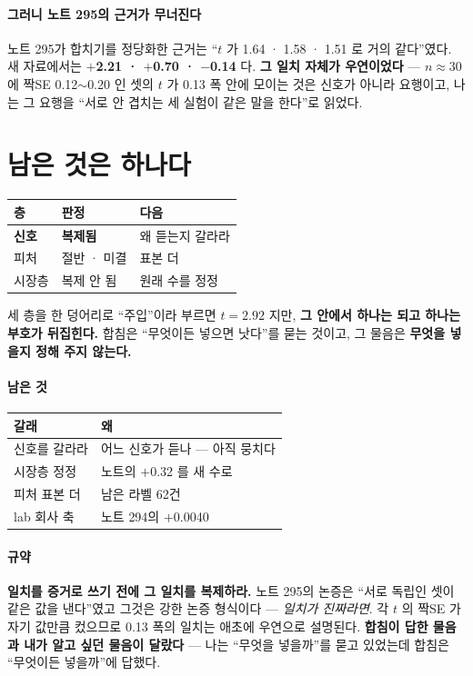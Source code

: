 \documentclass[10pt]{article}
\begin{document}
\paragraph{그러니 노트 295의 근거가 무너진다} 노트 295가 합치기를 정당화한
근거는 ``$t$ 가 1.64 · 1.58 · 1.51 로 거의 같다''였다. 새 자료에서는
\textbf{$+$2.21 · $+$0.70 · $-$0.14} 다. \textbf{그 일치 자체가 우연이었다} ---
$n{\approx}30$ 에 짝SE 0.12$\sim$0.20 인 셋의 $t$ 가 0.13 폭 안에 모이는 것은
신호가 아니라 요행이고, 나는 그 요행을 ``서로 안 겹치는 세 실험이 같은 말을
한다''로 읽었다.

\section{남은 것은 하나다}

\begin{center}\small
\begin{tabular}{lll}
\hline
층 & 판정 & 다음 \\
\hline
\textbf{신호} & \textbf{복제됨} & 왜 듣는지 갈라라 \\
피처 & 절반 · 미결 & 표본 더 \\
시장층 & 복제 안 됨 & 원래 수를 정정 \\
\hline
\end{tabular}
\end{center}

세 층을 한 덩어리로 ``주입''이라 부르면 $t{=}2.92$ 지만, \textbf{그 안에서
하나는 되고 하나는 부호가 뒤집힌다.} 합침은 ``무엇이든 넣으면 낫다''를
묻는 것이고, 그 물음은 \textbf{무엇을 넣을지 정해 주지 않는다.}

\paragraph{남은 것}
\begin{center}\small
\begin{tabular}{ll}
\hline
갈래 & 왜 \\
\hline
신호를 갈라라 & 어느 신호가 듣나 --- 아직 뭉치다 \\
시장층 정정 & 노트의 $+$0.32 를 새 수로 \\
피처 표본 더 & 남은 라벨 62건 \\
lab 회사 축 & 노트 294의 $+$0.0040 \\
\hline
\end{tabular}
\end{center}

\paragraph{규약} \textbf{일치를 증거로 쓰기 전에 그 일치를 복제하라.} 노트
295의 논증은 ``서로 독립인 셋이 같은 값을 낸다''였고 그것은 강한 논증
형식이다 --- \emph{일치가 진짜라면}. 각 $t$ 의 짝SE 가 자기 값만큼 컸으므로
0.13 폭의 일치는 애초에 우연으로 설명된다. \textbf{합침이 답한 물음과 내가
알고 싶던 물음이 달랐다} --- 나는 ``무엇을 넣을까''를 묻고 있었는데 합침은
``무엇이든 넣을까''에 답했다.
\end{document}
